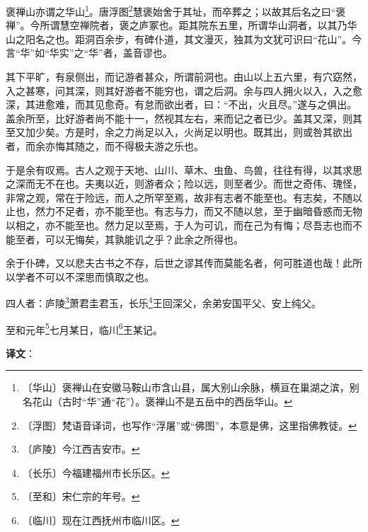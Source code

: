 \documentclass[12pt,UTF-8,openany]{ctexbook}
\begin{document}
\begin{normalsize}
    
    褒禅山亦谓之华山\footnote{〔华山〕褒禅山在安徽马鞍山市含山县，属大别山余脉，横亘在巢湖之滨，别名花山（古时“华”通“花”）。褒禅山不是五岳中的西岳华山。}。唐浮图\footnote{〔浮图〕梵语音译词，也写作“浮屠”或“佛图”，本意是佛，这里指佛教徒。}慧褒始舍于其址，而卒葬之；以故其后名之曰“褒禅”。今所谓慧空禅院者，褒之庐冢也。距其院东五里，所谓华山洞者，以其乃华山之阳名之也。距洞百余步，有碑仆道，其文漫灭，独其为文犹可识曰“花山”。今言“华”如“华实”之“华”者，盖音谬也。
    
    其下平旷，有泉侧出，而记游者甚众，所谓前洞也。由山以上五六里，有穴窈然，入之甚寒，问其深，则其好游者不能穷也，谓之后洞。余与四人拥火以入，入之愈深，其进愈难，而其见愈奇。有怠而欲出者，曰：“不出，火且尽。”遂与之俱出。盖余所至，比好游者尚不能十一，然视其左右，来而记之者已少。盖其又深，则其至又加少矣。方是时，余之力尚足以入，火尚足以明也。既其出，则或咎其欲出者，而余亦悔其随之，而不得极夫游之乐也。
    
    于是余有叹焉。古人之观于天地、山川、草木、虫鱼、鸟兽，往往有得，以其求思之深而无不在也。夫夷以近，则游者众；险以远，则至者少。而世之奇伟、瑰怪，非常之观，常在于险远，而人之所罕至焉，故非有志者不能至也。有志矣，不随以止也，然力不足者，亦不能至也。有志与力，而又不随以怠，至于幽暗昏惑而无物以相之，亦不能至也。然力足以至焉，于人为可讥，而在己为有悔；尽吾志也而不能至者，可以无悔矣，其孰能讥之乎？此余之所得也。
    
    余于仆碑，又以悲夫古书之不存，后世之谬其传而莫能名者，何可胜道也哉！此所以学者不可以不深思而慎取之也。
    
    四人者：庐陵\footnote{〔庐陵〕今江西吉安市。}萧君圭君玉，长乐\footnote{〔长乐〕今福建福州市长乐区。}王回深父，余弟安国平父、安上纯父。
    
    至和元年\footnote{〔至和〕宋仁宗的年号。}七月某日，临川\footnote{〔临川〕现在江西抚州市临川区。}王某记。
\end{normalsize}


\newpage

\textbf{译文}：

\vspace{1em}
\end{document}
